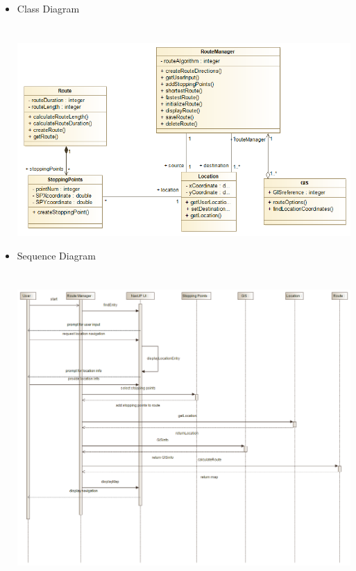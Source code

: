 \documentclass{article}
\begin{document}
			\begin{itemize}
 				\item Class Diagram
 				\\
 				\\
 				\\ 			
				\includegraphics[scale=0.75]{navigationClassDiagram.png}
			\pagebreak
			
				\item Sequence Diagram
 				\\
 				\\
 				\\ 			
				\includegraphics[scale=0.45]{navigationSequenceDiagram.png}
			\pagebreak
			

\end{itemize}
\end{document}
